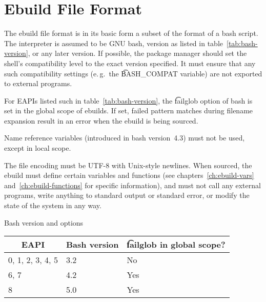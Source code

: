 \chapter{Ebuild File Format}
\label{ch:ebuild-format}

 The ebuild file format is in its basic form a subset of the format of
a bash script. The interpreter is assumed to be GNU bash, version as listed in
table~\ref{tab:bash-version}, or any later version. If possible, the package manager should set
the shell's compatibility level to the exact version specified. It must ensure that any such
compatibility settings (e.\,g.\ the \t{BASH_COMPAT} variable) are not exported to external programs.

 For EAPIs listed such in table~\ref{tab:bash-version}, the \t{failglob}
option of bash is set in the global scope of ebuilds. If set, failed pattern matches during
filename expansion result in an error when the ebuild is being sourced.

Name reference variables (introduced in bash version~4.3) must not be used, except in local scope.

The file encoding must be UTF-8 with Unix-style newlines. When sourced, the ebuild must define
certain variables and functions (see chapters~\ref{ch:ebuild-vars} and~\ref{ch:ebuild-functions}
for specific information), and must not call any external programs, write anything to standard
output or standard error, or modify the state of the system in any way.

\begin{centertable}{Bash version and options}
    \label{tab:bash-version}
    \begin{tabular}{lll}
      \toprule
      \multicolumn{1}{c}{\textbf{EAPI}} &
      \multicolumn{1}{c}{\textbf{Bash version}} &
      \multicolumn{1}{c}{\textbf{\t{failglob} in global scope?}} \\
      \midrule
      0, 1, 2, 3, 4, 5  & 3.2 & No  \\
      6, 7              & 4.2 & Yes \\
      8                 & 5.0 & Yes \\
      \bottomrule
    \end{tabular}
\end{centertable}


